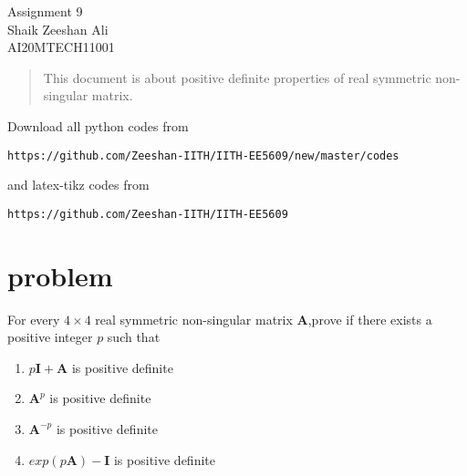 \documentclass[journal,12pt,twocolumn]{IEEEtran}
\numberwithin{equation}{subsection}
\let\vec\mathbf
\begin{document}
\begin{center}
\huge Assignment 9\\

\large Shaik Zeeshan Ali\\
\large AI20MTECH11001\\
\end{center}
\begin{abstract}
This document is about positive definite properties of real symmetric non-singular matrix.
\end{abstract}
Download all python codes from 
\begin{lstlisting}
https://github.com/Zeeshan-IITH/IITH-EE5609/new/master/codes
\end{lstlisting}

and latex-tikz codes from 
\begin{lstlisting}
https://github.com/Zeeshan-IITH/IITH-EE5609
\end{lstlisting}
\section{problem}
For every $4\times 4$ real symmetric non-singular matrix $\vec{A}$,prove if there exists a positive integer $p$ such that
\begin{enumerate}
    \item $p\vec{I}+\vec{A}$ is positive definite
    \item $\vec{A}^p$ is positive definite
    \item $\vec{A}^{-p}$ is positive definite
    \item $exp(p\vec{A})-\vec{I}$ is positive definite
\end{enumerate}
\end{document}
